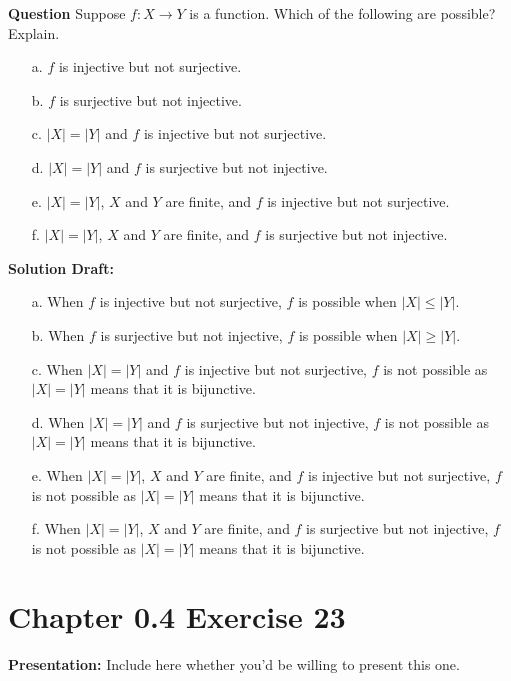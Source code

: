 \documentclass{article}
\begin{document}
\noindent\textbf{Question}
Suppose \(f : X \rightarrow Y\) is a function. Which of the following are possible? Explain.

\begin{itemize}
    \item[a.] \(f\) is injective but not surjective.
    \item[b.] \(f\) is surjective but not injective.
    \item[c.] \(|X| = |Y|\) and \(f\) is injective but not surjective.
    \item[d.] \(|X| = |Y|\) and \(f\) is surjective but not injective.
    \item[e.] \(|X| = |Y|\), \(X\) and \(Y\) are finite, and \(f\) is injective but not surjective.
    \item[f.] \(|X| = |Y|\), \(X\) and \(Y\) are finite, and \(f\) is surjective but not injective.
\end{itemize}

\noindent\textbf{Solution Draft:} 

\begin{itemize}
    \item[a.] When \(f\) is injective but not surjective, $f$ is possible when $|X| \le |Y|$.
    \item[b.] When \(f\) is surjective but not injective, $f$ is possible when $|X| \ge |Y|$.
    \item[c.] When \(|X| = |Y|\) and \(f\) is injective but not surjective, $f$ is not possible as \(|X| = |Y|\) means that it is bijunctive.
    \item[d.] When \(|X| = |Y|\) and \(f\) is surjective but not injective, $f$ is not possible as \(|X| = |Y|\) means that it is bijunctive.
    \item[e.] When \(|X| = |Y|\), \(X\) and \(Y\) are finite, and \(f\) is injective but not surjective, $f$ is not possible as \(|X| = |Y|\) means that it is bijunctive.
    \item[f.] When \(|X| = |Y|\), \(X\) and \(Y\) are finite, and \(f\) is surjective but not injective, $f$ is not possible as \(|X| = |Y|\) means that it is bijunctive.
\end{itemize}

\section*{Chapter 0.4 Exercise 23}  

\noindent\textbf{Presentation:} Include here whether you'd be willing to present this one. 
\end{document}
